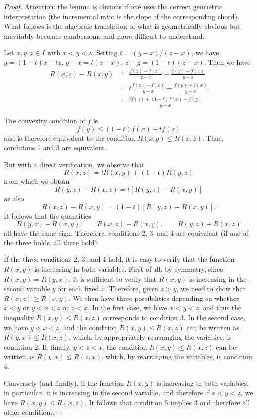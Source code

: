 \begin{proof}
Attention:
the lemma is obvious if one uses the correct geometric interpretation
(the incremental ratio is the slope of the corresponding chord).
What follows is the algebraic translation of what
is geometrically obvious but inevitably becomes cumbersome
and more difficult to understand.

Let $x,y,z\in I$ with $x<y<z$.
Setting $t=(y-x)/(z-x)$, we have $y=(1-t)x + tz$,
 $y-x = t(z-x)$, $z-y = (1-t)(z-x)$.
Then we have
 \begin{equation*}
 \begin{aligned}
 R(x,z) - R(x,y)
 &= \frac{f(z)-f(x)}{z-x} - \frac{f(y)-f(x)}{y-x} \\
  &= t\frac{f(z)-f(x)}{y-x} - \frac{f(y)-f(x)}{y-x} \\
  &= \frac{tf(z) + (1-t) f(x) - f(y)}{y-x}
 \end{aligned}
 \end{equation*}

The convexity condition of $f$ is
\[
  f(y) \le (1-t)f(x) + tf(z)
\]
and is therefore equivalent to the condition $R(x,y) \le R(x,z)$.
Thus, conditions 1 and 3 are equivalent.

But with a direct verification, we observe that
\[
  R(x,z) = t R(x,y) + (1-t) R(y,z)
\]
from which we obtain
\[
  R(y,z) - R(x,z) = t[R(y,z) - R(x,y)]
\]
or also
\[
 R(x,z) - R(x,y) = (1-t) [R(y,z) - R(x,y)].
\]
It follows that the quantities
\[
  R(y,z) - R(x,y), \qquad
  R(x,z) - R(x,y), \qquad
  R(y,z) - R(x,z)
\]
all have the same sign. Therefore, conditions 2, 3, and 4 are equivalent (if one
of the three holds, all three hold).

If the three conditions 2, 3, and 4 hold, it is easy to verify that the function
$R(x,y)$ is increasing in both variables. First of all, by symmetry, since
$R(x,y) = R(y,x)$, it is sufficient to verify that $R(x,y)$ is increasing in the
second variable $y$ for each fixed $x$. Therefore, given $z>y$, we need to show
that $R(x,z) \ge R(x,y)$.
We then have three possibilities depending on whether $x<y$ or $y<x<z$ or $z<x$.
In the first case, we have $x<y<z$, and thus the inequality $R(x,y) \le R(x,z)$
corresponds to condition 3.
In the second case, we have $y<x<z$, and the condition $R(x,y)\le R(x,z)$ can be
written as $R(y,x) \le R(x,z)$, which, by appropriately rearranging the
variables, is condition 2. If, finally, $y < z < x$, the condition $R(x,y) \le
R(x,z)$ can be written as $R(y,x) \le R(z,x)$, which, by rearranging the
variables, is condition 4.

Conversely (and finally), if the function $R(x,y)$ is increasing in both
variables, in particular, it is increasing in the second variable, and therefore
if $x<y<z$, we have $R(x,y) \le R(x,z)$. It follows that condition 5 implies 3
and therefore all other conditions.
\end{proof}

